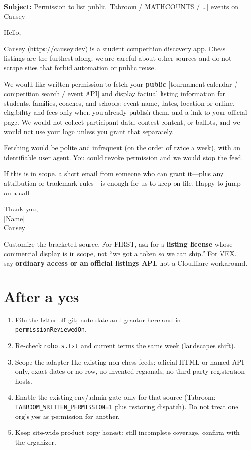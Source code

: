\documentclass[11pt]{article}
\begin{document}
\noindent\textbf{Subject:} Permission to list public [Tabroom / MATHCOUNTS / \ldots] events on Causey

\begin{displayquote}
Hello,

Causey (\url{https://causey.dev}) is a student competition discovery app. Chess listings are the furthest along; we are careful about other sources and do not scrape sites that forbid automation or public reuse.

We would like written permission to fetch your \textbf{public} [tournament calendar / competition search / event API] and display factual listing information for students, families, coaches, and schools: event name, dates, location or online, eligibility and fees only when you already publish them, and a link to your official page. We would not collect participant data, contest content, or ballots, and we would not use your logo unless you grant that separately.

Fetching would be polite and infrequent (on the order of twice a week), with an identifiable user agent. You could revoke permission and we would stop the feed.

If this is in scope, a short email from someone who can grant it---plus any attribution or trademark rules---is enough for us to keep on file. Happy to jump on a call.

Thank you,\\
{[Name]}\\
Causey
\end{displayquote}

Customize the bracketed source. For FIRST, ask for a \textbf{listing license} whose commercial display is in scope, not ``we got a token so we can ship.'' For VEX, say \textbf{ordinary access or an official listings API}, not a Cloudflare workaround.

\section*{After a yes}

\begin{enumerate}
  \item File the letter off-git; note date and grantor here and in \texttt{permissionReviewedOn}.
  \item Re-check \texttt{robots.txt} and current terms the same week (landscapes shift).
  \item Scope the adapter like existing non-chess feeds: official HTML or named API only, exact dates or no row, no invented regionals, no third-party registration hosts.
  \item Enable the existing env/admin gate only for that source (Tabroom:
        \texttt{TABROOM\_WRITTEN\_PERMISSION=1} plus restoring dispatch).
        Do not treat one org's yes as permission for another.
  \item Keep site-wide product copy honest: still incomplete coverage, confirm with the organizer.
\end{enumerate}
\end{document}
